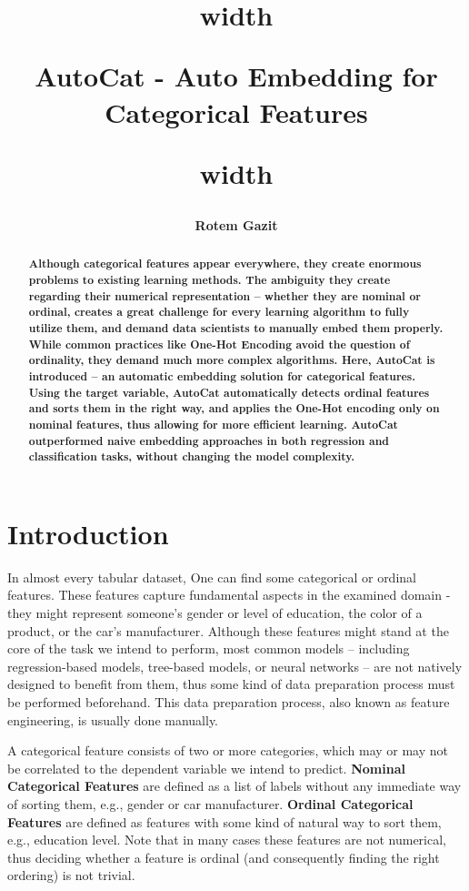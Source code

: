 \documentclass{article}
\title{
\noindent\vrule height 2.5pt width \textwidth
\begin{center}
    \bfseries AutoCat - Auto Embedding for Categorical Features
\end{center}
\noindent\vrule height 2.5pt width \textwidth
}
\author{\bfseries Rotem Gazit}
\date{}
\begin{document}
\maketitle


\begin{abstract}
\bfseries
Although categorical features appear everywhere, they create enormous problems to existing learning methods. The ambiguity they create regarding their numerical representation -- whether they are nominal or ordinal, creates a great challenge for every learning algorithm to fully utilize them, and demand data scientists to manually embed them properly. While common practices like One-Hot Encoding avoid the question of ordinality, they demand much more complex algorithms. Here, AutoCat is introduced -- an automatic embedding solution for categorical features. Using the target variable, AutoCat automatically detects ordinal features and sorts them in the right way, and applies the One-Hot encoding only on nominal features, thus allowing for more efficient learning. AutoCat outperformed naive embedding approaches in both regression and classification tasks, without changing the model complexity.
\end{abstract}

\section{Introduction}
In almost every tabular dataset, One can find some categorical or ordinal features. These features capture fundamental aspects in the examined domain - they might represent someone’s gender or level of education, the color of a product, or the car’s manufacturer. Although these features might stand at the core of the task we intend to perform, most common models – including regression-based models, tree-based models, or neural networks – are not natively designed to benefit from them, thus some kind of data preparation process must be performed beforehand. This data preparation process, also known as feature engineering, is usually done manually.

A categorical feature consists of two or more categories, which may or may not be correlated to the dependent variable we intend to predict. \textbf{Nominal Categorical Features} are defined as a list of labels without any immediate way of sorting them, e.g., gender or car manufacturer. \textbf{Ordinal Categorical Features} are defined as features with some kind of natural way to sort them, e.g., education level. Note that in many cases these features are not numerical, thus deciding whether a feature is ordinal (and consequently finding the right ordering) is not trivial.
\end{document}
